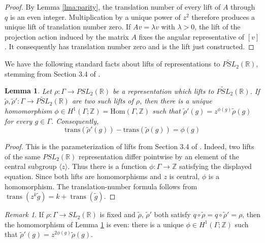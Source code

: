 \documentclass{article}
\theoremstyle{plain}
\theoremstyle{definition}
\theoremstyle{plain}
\theoremstyle{plain}
\theoremstyle{plain}
\newtheorem{lemma}[theorem]{Lemma}
\theoremstyle{remark}
\newtheorem{remark}[theorem]{Remark}
\theoremstyle{remark}
\theoremstyle{plain}
\theoremstyle{plain}
\theoremstyle{plain}
\theoremstyle{plain}
\begin{document}
\begin{proof}
By Lemma \ref{lma:parity}, the translation number of every lift of $A$ through $q$ is an even integer. Multiplication by a unique power of $z^2$ therefore produces a unique lift of translation number zero. If $Av = \lambda v$ with $\lambda > 0$, the lift of the projection action induced by the matrix $A$ fixes the angular representative of $[v]$. It consequently has translation number zero and is the lift just constructed. 
\end{proof}

We have the following standard facts about lifts of representations to $\widetilde{PSL}_2(\mathbb{R})$, stemming from Section 3.4 of \cite{cullerdunfield}. 

\begin{lemma}\label{lma:changinglifts}
Let $\rho: \Gamma \to PSL_2(\mathbb{R})$ be a representation which lifts to $\widetilde{PSL}_2(\mathbb{R})$. If $\widetilde\rho, \widetilde\rho': \Gamma \to \widetilde{PSL}_2(\mathbb{R})$ are two such lifts of $\rho$, then there is a unique homomorphism $\phi \in H^1(\Gamma; \mathbb{Z}) = \mathrm{Hom}(\Gamma, \mathbb{Z})$ such that $\widetilde\rho'(g) = z^{\phi(g)}\widetilde\rho(g)$ for every $g \in \Gamma$. Consequently, 
\begin{equation*}
	\mathrm{trans}(\widetilde\rho'(g)) - \mathrm{trans}(\widetilde\rho(g)) = \phi(g)
\end{equation*}
\end{lemma}

\begin{proof}
This is the parameterization of lifts from Section 3.4 of \cite{cullerdunfield}. Indeed, two lifts of the same $PSL_2(\mathbb R)$ representation differ pointwise by an element of the central subgroup $\langle z\rangle$. Thus there is a function $\phi:\Gamma\to\mathbb Z$ satisfying the displayed equation. Since both lifts are homomorphisms and $z$ is central, $\phi$ is a homomorphism. The translation-number formula follows from $\operatorname{trans}(z^k\widetilde g) = k+\operatorname{trans}(\widetilde g)$. 
\end{proof}

\begin{remark}\label{rmk:evenliftchange}
If $\rho: \Gamma \to SL_2(\mathbb R)$ is fixed and $\widetilde\rho$, $\widetilde\rho'$ both satisfy $q \circ \widetilde\rho = q \circ \widetilde\rho' = \rho$, then the homomorphism of Lemma \ref{lma:changinglifts} is even: there is a unique $\phi \in H^1(\Gamma; \mathbb Z)$ such that $\widetilde\rho'(g) = z^{2\phi(g)}\widetilde\rho(g)$. 
\end{remark}
\end{document}
